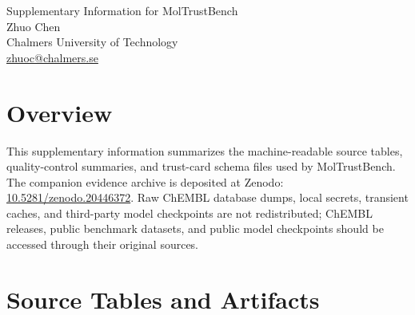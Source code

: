 \documentclass[10pt]{article}
\begin{document}
\begin{center}
{\Large Supplementary Information for MolTrustBench}\\[0.4em]
Zhuo Chen\\
Chalmers University of Technology\\
\href{mailto:zhuoc@chalmers.se}{zhuoc@chalmers.se}
\end{center}

\section*{Overview}

This supplementary information summarizes the machine-readable source tables,
quality-control summaries, and trust-card schema files used by MolTrustBench.
The companion evidence archive is deposited at Zenodo:
\href{https://doi.org/10.5281/zenodo.20446372}{10.5281/zenodo.20446372}. Raw ChEMBL database
dumps, local secrets, transient caches, and third-party model checkpoints are
not redistributed; ChEMBL releases, public benchmark datasets, and public model
checkpoints should be accessed through their original sources.

\section*{Source Tables and Artifacts}
\end{document}

